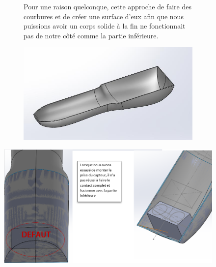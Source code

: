 \begin{figure}[!htbp]
    \centering
    \begin{subfigure}[m]{.2\linewidth}
       Pour une raison quelconque, cette approche de faire des courbures et de créer une surface d’eux afin que nous puissions avoir un corps solide à la fin ne fonctionnait pas de notre côté comme la partie inférieure.
    \end{subfigure}
    \hfill
    \begin{subfigure}{.75\linewidth}
        \centering
        \includegraphics[width=\linewidth]{assets/conception1/img235.jpg}
    \end{subfigure}
\end{figure}

\begin{figure}[!htbp]
    \centering
    \includegraphics[width=\linewidth]{assets/conception1/16.png}
\end{figure}

\FloatBarrier

